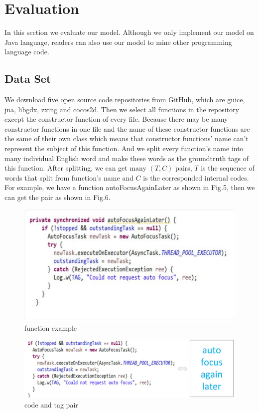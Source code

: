 \section{Evaluation}
In this section we evaluate our model. Although we only implement our model on Java language, readers can also use our model to mine other programming language code.
\subsection{Data Set}
We download five open source code repositories from GitHub, which are guice, jna, libgdx, zxing and cocos2d. Then we select all functions in the repository except the constructor function of every file. Because there may be many constructor functions in one file and the name of these constructor functions are the same of their own class which means that constructor functions' name can't represent the subject of this function. And we split every function's name into many individual English word and make these words as the groundtruth tags of this function. After splitting, we can get many $(T,C)$ pairs, $T$ is the sequence of words that split from function's name and $C$ is the corresponded internal codes. For example, we have a function autoFocusAgainLater as shown in Fig.5, then we can get the pair as shown in Fig.6.
\begin{figure}[!htp]
 \centering
 \includegraphics[width=\linewidth]{img/function.pdf}
 \caption{function example}
\end{figure}

\begin{figure}[!htp]
 \centering
 \includegraphics[width=\linewidth]{img/pair.pdf}
 \caption{code and tag pair}
\end{figure}

